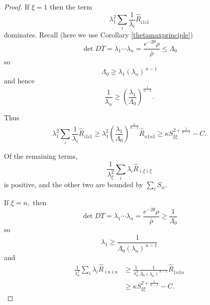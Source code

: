 \documentclass[10pt,a4paper]{amsart}
\newcommand{\maxidx}{\mathord{\xi}} %
\begin{document}
\begin{proof}
If $\maxidx=1$ then the term
\[
\lambda_{1}^{2} \sum_{i}\frac{1}{\lambda_{i}}\hat{R}_{i\bar{1}i\bar{1}}
\]
dominates. Recall (here we use Corollary \ref{thetamaxprinciple}) 
\[
\det DT=\lambda_{1}\cdots\lambda_{n}
=\frac{e^{-2\theta}\rho}{\bar{\rho}}
\leq\Lambda_{0}
\]
so
\[
\Lambda_{0}\geq\lambda_{1}(\lambda_{n})^{\,n-1}
\]
and hence
\[
\frac{1}{\lambda_{n}}
\geq\left(  \frac{\lambda_{1}}{\Lambda_{0}}\right)^{\!\frac{1}{n-1}}.
\]

Thus
\[
\lambda_{1}^{2}\sum_{i}\frac{1}{\lambda_{i}}\hat{R}_{i\bar{1}i\bar{1}}
\geq
\lambda_{1}^{2}\left(  \frac{\lambda_{1}}{\Lambda_{0}}\right)^{\!\frac{1}{n-1}}
\hat{R}_{n\bar{1}n\bar{1}}
\geq
\kappa S_{\maxidx\maxidx}^{2+\frac{1}{n-1}}-C.
\]

Of the remaining terms,
\[
\frac{1}{\lambda_{\maxidx}^{2}}\sum_{i}\lambda_{i}\hat{R}_{\overline{\imath}\maxidx\overline{\imath}\maxidx}
\]
is positive, and the other two are bounded by $\sum_{i}S_{ii}.$

If $\maxidx=n,$ then
\[
\det DT=\lambda_{1}\cdots\lambda_{n}
=\frac{e^{-2\theta}\rho}{\bar{\rho}}
\geq\frac{1}{\Lambda_{0}}
\]
so
\[
\lambda_{1}\geq
\frac{1}{\Lambda_{0}(\lambda_{n})^{\,n-1}}
\]
and
\begin{align*}
\frac{1}{\lambda_{n}^{2}}\sum_{i}\lambda_{i}\hat{R}_{\bar{\imath}n\bar{\imath}n}
&\geq
\frac{1}{\lambda_{n}^{2}}
\frac{1}{\Lambda_{0}(\lambda_{n})^{\,n-1}}
\hat{R}_{\bar{1}n\bar{1}n}\\
&\geq
\kappa S_{\maxidx\maxidx}^{2+\frac{1}{n-1}}-C.
\end{align*}

\end{proof}
\end{document}
